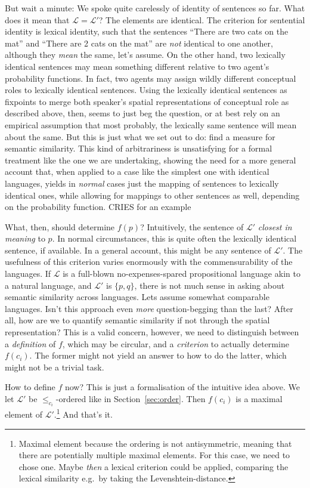 \documentclass[11pt, a4paper]{scrartcl}
\renewcommand{\i}[1]{\emph{#1}}
\renewcommand{\L}{\mathcal{L}}
\begin{document}
But wait a minute: We spoke quite carelessly of identity of sentences so far. What does it mean that $\L = \L'$? The elements are identical. The criterion for sentential identity is lexical identity, such that the sentences ``There are two cats on the mat'' and ``There are 2 cats on the mat'' are \i{not} identical to one another, although they \i{mean} the same, let's assume. On the other hand, two lexically identical sentences may mean something different relative to two agent's probability functions. In fact, two agents may assign wildly different conceptual roles to lexically identical sentences. Using the lexically identical sentences as fixpoints to merge both speaker's spatial representations of conceptual role as described above, then, seems to just beg the question, or at best rely on an empirical assumption that most probably, the lexically same sentence will mean about the same. But this is just what we set out to do: find a measure for semantic similarity. This kind of arbitrariness is unsatisfying for a formal treatment like the one we are undertaking, showing the need for a more general account that, when applied to a case like the simplest one with identical languages, yields in \i{normal} cases just the mapping of sentences to lexically identical ones, while allowing for mappings to other sentences as well, depending on the probability function.{\color{red} CRIES for an example} 

What, then, should determine $f(p)$? Intuitively, the sentence of $\L'$ \i{closest in meaning} to $p$. In normal circumstances, this is quite often the lexically identical sentence, if available. In a general account, this might be any sentence of $\L'$. The usefulness of this criterion varies enormously with the commensurability of the languages. If $\L$ is a full-blown no-expenses-spared propositional language akin to a natural language, and $\L'$ is $\{p, q\}$, there is not much sense in asking about semantic similarity across languages. Lets assume somewhat comparable languages. Isn't this approach even \i{more} question-begging than the last? After all, how are we to quantify semantic similarity if not through the spatial representation? This is a valid concern, however, we need to distinguish between a \i{definition} of $f$, which may be circular, and a \i{criterion} to actually determine $f(c_i)$. The former might not yield an answer to how to do the latter, which might not be a trivial task.

How to define $f$ now? This is just a formalisation of the intuitive idea above. 
We let $\L'$ be $\leqslant_{c_i}$-ordered like in Section~\ref{sec:order}. Then $f(c_i)$ is a maximal element of $\L'$.\footnote{Maximal element because the ordering is not antisymmetric, meaning that there are potentially multiple maximal elements. For this case, we need to chose one. Maybe \i{then} a lexical criterion could be applied, comparing the lexical similarity e.g.\ by taking the Levenshtein-distance.} And that's it. 
\end{document}
